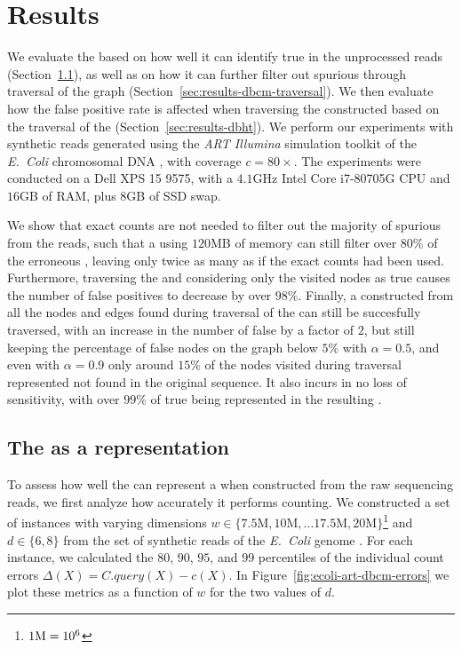 \chapter{Results}

We evaluate the \dBCM based on how well it can identify true  in the unprocessed reads (Section~\ref{sec:results-dbcm-counting}), as well as on how it can further filter out spurious  through traversal of the graph (Section~\ref{sec:results-dbcm-traversal}). We then evaluate how the false positive rate is affected when traversing the \dBHT constructed based on the traversal of the \dBCM (Section~\ref{sec:results-dbht}). We perform our experiments with synthetic reads generated using the \emph{ART Illumina} simulation toolkit \cite{Huang2011} of the \emph{E.~Coli} chromosomal DNA \cite{ecoligenome}, with coverage $c = 80\times$. The experiments were conducted on a Dell XPS 15 9575, with a $4.1$GHz Intel Core i7-80705G CPU and $16$GB of RAM, plus $8$GB of SSD swap.

We show that exact counts are not needed to filter out the majority of spurious  from the reads, such that a \dBCM using $120$MB of memory can still filter over $80\%$ of the erroneous , leaving only twice as many as if the exact counts had been used. Furthermore, traversing the \dBCM and considering only the visited nodes as true  causes the number of false positives to decrease by over $98\%$. Finally, a \dBHT constructed from all the nodes and edges found during traversal of the \dBCM can still be succesfully traversed, with an increase in the number of false  by a factor of $2$, but still keeping the percentage of false nodes on the graph below $5\%$ with $\alpha = 0.5$, and even with $\alpha = 0.9$ only around $15\%$ of the nodes visited during traversal represented  not found in the original sequence. It also incurs in no loss of sensitivity, with over $99\%$ of true  being represented in the resulting \dBG.

\section{The \dBCM as a \dBG representation}
\label{sec:results-dbcm-counting}

To assess how well the \dBCM can represent a \dBG when constructed from the raw sequencing reads, we first analyze how accurately it performs \kmer counting. We constructed a set of \dBCM instances with varying dimensions $w \in \{7.5\text{M}, 10\text{M}, \ldots 17.5\text{M}, 20\text{M}\}$\footnote{$1\mega = 10^6$} and $d \in \{6, 8\}$ from the set of synthetic reads of the \emph{E.~Coli} genome \cite{ecoligenome}. For each instance, we calculated the $80$, $90$, $95$, and $99$ percentiles of the individual count errors $\Delta(X) = C.\mathit{query}(X) - c(X)$. In Figure~\ref{fig:ecoli-art-dbcm-errors} we plot these metrics as a function of $w$ for the two values of $d$.

